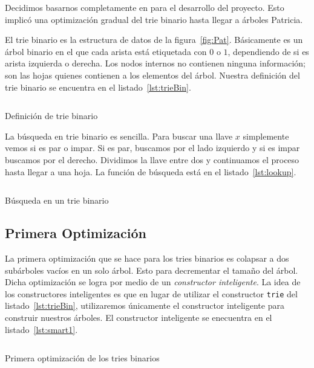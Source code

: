 \documentclass[11pt,letterpaper]{article}
\begin{document}
\noindent Decidimos basarnos completamente en\cite{} para el desarrollo del proyecto. Esto implicó una optimización gradual del trie binario hasta llegar a árboles Patricia.

El trie binario es la estructura de datos de la figura~\ref{fig:Pat}. Básicamente es un árbol binario en el que cada arista está etiquetada con $0$ o $1$, dependiendo de si es arista izquierda o derecha. Los nodos internos no contienen ninguna información; son las hojas quienes contienen a los elementos del árbol. Nuestra definición del trie binario se encuentra en el listado~\ref{lst:trieBin}.

\begin{listing}[H]
  \inputminted{coq}{src/trie.v}
  \caption{Definición de trie binario}
  \label{lst:trieBin}
\end{listing}

La búsqueda en trie binario es sencilla. Para buscar una llave $x$ simplemente vemos si es par o impar. Si es par, buscamos por el lado izquierdo y si es impar buscamos por el derecho. Dividimos la llave entre dos y continuamos el proceso hasta llegar a una hoja. La función de búsqueda está en el listado~\ref{lst:lookup}.

\begin{listing}[H]
  \inputminted{coq}{src/lookup.v}
  \caption{Búsqueda en un trie binario}
  \label{lst:lookup}
\end{listing}


\subsection{Primera Optimización}
\noindent La primera optimización que se hace para los tries binarios es colapsar a dos subárboles vacíos en un solo árbol. Esto para decrementar el tamaño del árbol. Dicha optimización se logra por medio de un \textit{constructor inteligente}. La idea de los constructores inteligentes es que en lugar de utilizar el constructor \texttt{trie} del listado~\ref{lst:trieBin}, utilizaremos únicamente el constructor inteligente para construir nuestros árboles. El constructor inteligente se enecuentra en el listado~\ref{lst:smart1}.

\begin{listing}[H]
  \inputminted{coq}{src/smart1.v}
  \caption{Primera optimización de los tries binarios}
  \label{lst:smart1}
\end{listing}
\end{document}
